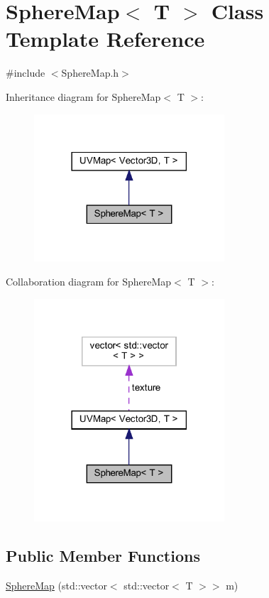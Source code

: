 \hypertarget{classSphereMap}{}\section{Sphere\+Map$<$ T $>$ Class Template Reference}
\label{classSphereMap}


{\ttfamily \#include $<$Sphere\+Map.\+h$>$}



Inheritance diagram for Sphere\+Map$<$ T $>$\+:
\nopagebreak
\begin{figure}[H]
\begin{center}
\leavevmode
\includegraphics[width=201pt]{classSphereMap__inherit__graph}
\end{center}
\end{figure}


Collaboration diagram for Sphere\+Map$<$ T $>$\+:
\nopagebreak
\begin{figure}[H]
\begin{center}
\leavevmode
\includegraphics[width=201pt]{classSphereMap__coll__graph}
\end{center}
\end{figure}
\subsection*{Public Member Functions}
\begin{DoxyCompactItemize}
\item 
\mbox{\hyperlink{classSphereMap_ab8c9adf071beed745fee8c7ee8c3bbc1}{Sphere\+Map}} (std\+::vector$<$ std\+::vector$<$ T $>$$>$ m)
\end{DoxyCompactItemize}
